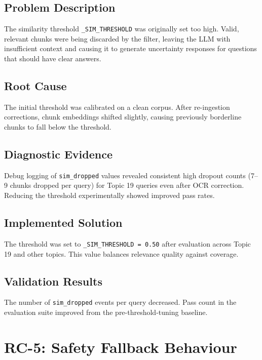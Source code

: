 \documentclass[12pt, a4paper]{report}
\newcommand{\codeinline}[1]{\texttt{#1}}
\begin{document}
\subsection{Problem Description}

The similarity threshold \codeinline{\_SIM\_THRESHOLD} was originally set too
high. Valid, relevant chunks were being discarded by the filter, leaving the LLM
with insufficient context and causing it to generate uncertainty responses for
questions that should have clear answers.

\subsection{Root Cause}

The initial threshold was calibrated on a clean corpus. After re-ingestion
corrections, chunk embeddings shifted slightly, causing previously borderline
chunks to fall below the threshold.

\subsection{Diagnostic Evidence}

Debug logging of \codeinline{sim\_dropped} values revealed consistent high
dropout counts (7--9 chunks dropped per query) for Topic 19 queries even after
OCR correction. Reducing the threshold experimentally showed improved pass rates.

\subsection{Implemented Solution}

The threshold was set to \codeinline{\_SIM\_THRESHOLD = 0.50} after evaluation
across Topic 19 and other topics. This value balances relevance quality against
coverage.

\subsection{Validation Results}

The number of \codeinline{sim\_dropped} events per query decreased. Pass count
in the evaluation suite improved from the pre-threshold-tuning baseline.

\section{RC-5: Safety Fallback Behaviour}
\label{sec:rc5}
\end{document}
